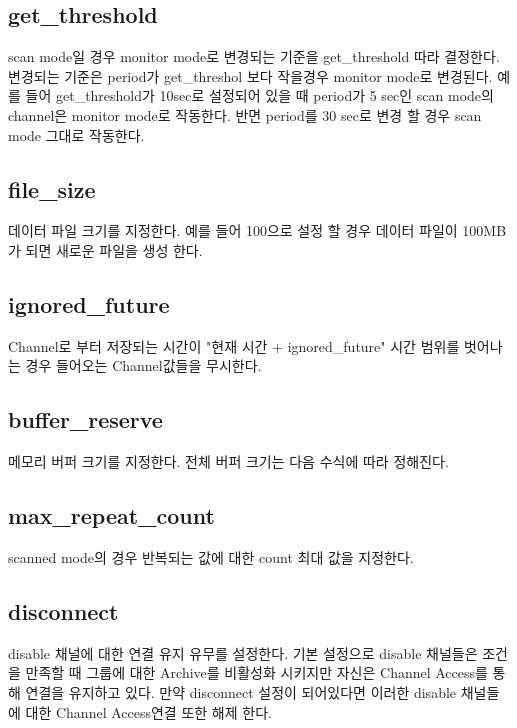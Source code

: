 \documentclass[11pt
  , a4paper
  , article
  , oneside
]{memoir}
\begin{document}
\subsection{get\_threshold}
scan mode일 경우 monitor mode로 변경되는 기준을 get\_threshold 따라 결정한다.
변경되는 기준은 period가 get\_threshol 보다 작을경우 monitor mode로 변경된다.
예를 들어 get\_threshold가 10sec로 설정되어 있을 때 period가 5 sec인 scan mode의 
channel은 monitor mode로 작동한다. 반면 period를 30 sec로 변경 할 경우 scan mode 그대로
작동한다.
\subsection{file\_size}
데이터 파일 크기를 지정한다. 예를 들어 100으로 설정 할 경우 데이터 파일이 100MB가 되면
새로운 파일을 생성 한다.

\subsection{ignored\_future}
Channel로 부터 저장되는 시간이 "현재 시간 + ignored\_future" 시간 범위를 벗어나는 경우
들어오는 Channel값들을 무시한다. 

\subsection{buffer\_reserve}
메모리 버퍼 크기를 지정한다. 전체 버퍼 크기는 다음 수식에 따라 정해진다.

\subsection{max\_repeat\_count}
scanned mode의 경우 반복되는 값에 대한 count 최대 값을 지정한다. 

\subsection{disconnect}
disable 채널에 대한 연결 유지 유무를 설정한다. 기본 설정으로 disable 채널들은
조건을 만족할 때 그룹에 대한 Archive를 비활성화 시키지만 자신은 Channel Access를 통해
연결을 유지하고 있다. 만약 disconnect 설정이 되어있다면 이러한 disable 채널들에 대한
Channel Access연결 또한 해제 한다.
\end{document}
